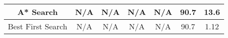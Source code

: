 \begin{table*}[t]
\begin{center}
\begin{tabular}{|c|c|c|c|c|c|c|c|}
			\multicolumn{2}{|c|}{A* Search}                        & N/A                 & N/A             & N/A                                                                                    & N/A                 & 90.7            & 13.6                                                                                   \\ \hline
			\multicolumn{2}{|c|}{Best First Search}                & N/A                 & N/A             & N/A                                                                                    & N/A                 & 90.7            & 1.12                                                                                   \\ \hline
		\end{tabular}
	\end{center}
\end{table*}